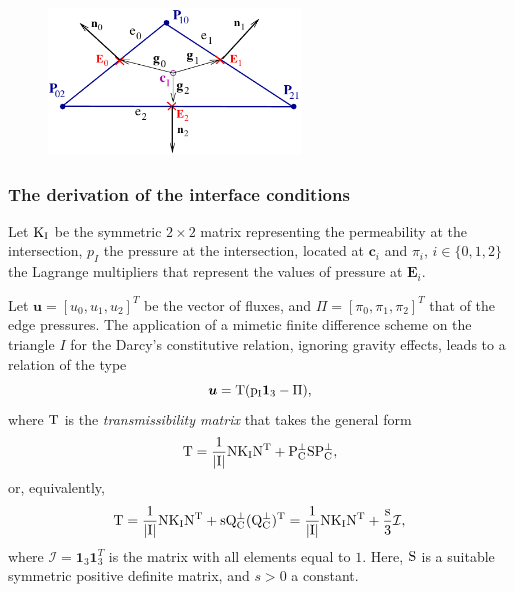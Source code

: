 \documentclass[11pt,a4paper,twoside]{article}
\newcommand{\centerpoint}{\ensuremath{\boldsymbol{c}}}
\newcommand{\flux}{\ensuremath{u}}
\newcommand{\pressure}{\ensuremath{p}}
\newcommand{\edgepressure}{\ensuremath{\pi}}
\newcommand{\N}{\ensuremath{\rm N}}
\newcommand{\QC}{\ensuremath{\rm Q}_C^{\perp}}
\newcommand{\PC}{\ensuremath{\rm P}_C^{\perp}}
\newcommand{\perm}{\ensuremath{\rm K}_I}
\newcommand{\trans}{\ensuremath{\rm T}}
\newcommand{\fluxvector}{\ensuremath{\boldsymbol{u}}}
\newcommand{\centeredge}{\ensuremath{\boldsymbol{E}}}
\begin{document}
\begin{figure}
\begin{center}
\includegraphics[width=0.6\textwidth]{Figure/triangle}
\caption{\label{fig:triangle}}
\end{center}
\end{figure}

\subsubsection{The derivation of the interface conditions}
Let $\perm$ be the symmetric $2\times 2$ matrix representing the
permeability at the intersection, $\pressure_I$ the pressure at the
intersection, located at $\centerpoint_i$ and $\edgepressure_i$,
$i\in\{0,1,2\}$ the Lagrange multipliers that represent the values of pressure
at $\centeredge_i$.

Let $\fluxvector=[\flux_0,\flux_1,\flux_2]^T$ be the vector of fluxes,
and $\Pi=[\edgepressure_0,\edgepressure_1,\edgepressure_2]^T$ that of
the edge pressures.  The application of a mimetic finite difference
scheme on the triangle $I$ for the Darcy's constitutive relation,
ignoring gravity effects, leads to a relation of the type
\begin{equation}
\label{eq:constitutive}
\fluxvector=\trans(\pressure_I\boldsymbol{1}_3-\Pi),
\end{equation}
where $\trans$ is the \emph{transmissibility matrix} that takes the general form
\begin{equation}
\label{eq:trans}
\trans=\dfrac{1}{|I|}\N\perm\N^T + \PC{\rm S}\PC,
\end{equation}
or, equivalently,
\begin{equation}
\label{eq:trans2}
\trans=\frac{1}{|I|}\N\perm\N^T + s\QC(\QC)^T=\dfrac{1}{|I|}\N\perm\N^T + \dfrac{s}{3}\mathcal{I},
\end{equation}
where $\mathcal{I}=\boldsymbol{1}_3\boldsymbol{1}_3^T$ is the matrix with all elements equal to $1$.
Here, ${\rm S}$ is a suitable symmetric positive definite matrix, and $s>0$ 
a constant.
\end{document}
